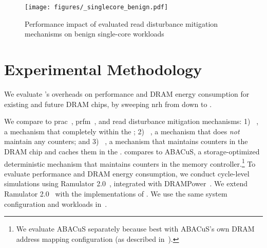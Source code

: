 \begin{figure*}[b]
\centering
\texttt{[image: figures/\_singlecore\_benign.pdf]}
\caption{Performance impact of evaluated read disturbance mitigation mechanisms on benign single-core workloads}
\label{fig:benign_singlecore}
\end{figure*}

\section{Experimental Methodology}
\label{sec:methodology}

We evaluate \X{}'s overheads on performance and DRAM energy consumption for existing and future DRAM chips, by sweeping \gls{nrh} from  down to .

 We compare \X{} to \gls{prac}~\cite{jedec2024jesd795c}, \gls{prfm}~\cite{jedec2024jesd795c}, and   read disturbance mitigation mechanisms:
1) ~\cite{park2020graphene}, a  mechanism that  completely within the ; 
2) ~\cite{kim2014flipping}, a   mechanism that does \emph{not} maintain any counters; and
3) ~\cite{qureshi2022hydra}, a  mechanism that maintains counters in the DRAM chip and caches them in the .
 compares \X{} to ABACuS, a storage-optimized deterministic mechanism that maintains counters in the memory controller.\footnote{We evaluate ABACuS separately because  best with ABACuS's own DRAM address mapping configuration (as described in~\cite{olgun2024abacus}).}
To evaluate performance and DRAM energy consumption, we conduct cycle-level simulations using Ramulator 2.0~\cite{ramulator2github, luo2023ramulator2}, integrated with DRAMPower~\cite{drampower}.
We extend Ramulator 2.0~\cite{ramulator2github, luo2023ramulator2} with the implementations of \X{} .
We use the same system configuration and workloads in~.

